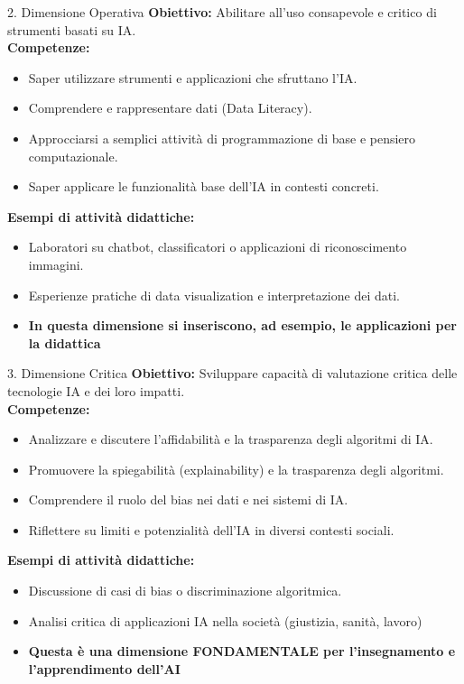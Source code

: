 \documentclass{beamer}
\begin{document}
%
%
\begin{frame}{2. Dimensione Operativa}
  \textbf{Obiettivo:} Abilitare all’uso consapevole e critico di strumenti basati su IA.\\[1em]
  \textbf{Competenze:}
  \begin{itemize}
    \item Saper utilizzare strumenti e applicazioni che sfruttano l’IA.
    \item Comprendere e rappresentare dati (Data Literacy).
    \item Approcciarsi a semplici attività di programmazione di base e pensiero computazionale.
    \item Saper applicare le funzionalità base dell’IA in contesti concreti.
  \end{itemize}
  \textbf{Esempi di attività didattiche:}
  \begin{itemize}
    \item Laboratori su chatbot, classificatori o applicazioni di riconoscimento immagini.
    \item Esperienze pratiche di data visualization e interpretazione dei dati.
    \item \textbf{In questa dimensione si inseriscono, ad esempio, le applicazioni per la didattica}
  \end{itemize}
\end{frame}
%
%
\begin{frame}{3. Dimensione Critica}
  \textbf{Obiettivo:} Sviluppare capacità di valutazione critica delle tecnologie IA e dei loro impatti.\\[1em]
  \textbf{Competenze:}
  \begin{itemize}
    \item Analizzare e discutere l’affidabilità e la trasparenza degli algoritmi di IA.
    \item Promuovere la spiegabilità (explainability) e la trasparenza degli algoritmi.
    \item Comprendere il ruolo del bias nei dati e nei sistemi di IA.
    \item Riflettere su limiti e potenzialità dell’IA in diversi contesti sociali.
  \end{itemize}
  \textbf{Esempi di attività didattiche:}
  \begin{itemize}
    \item Discussione di casi di bias o discriminazione algoritmica.
    \item Analisi critica di applicazioni IA nella società (giustizia, sanità, lavoro)
    \item \textbf{Questa è una dimensione FONDAMENTALE per l'insegnamento e l'apprendimento dell'AI}
  \end{itemize}
\end{frame}
\end{document}

